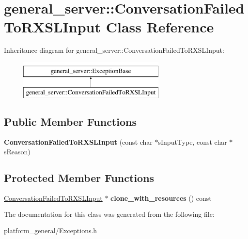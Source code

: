 \hypertarget{classgeneral__server_1_1ConversationFailedToRXSLInput}{\section{general\-\_\-server\-:\-:\-Conversation\-Failed\-To\-R\-X\-S\-L\-Input \-Class \-Reference}
\label{classgeneral__server_1_1ConversationFailedToRXSLInput}
}
\-Inheritance diagram for general\-\_\-server\-:\-:\-Conversation\-Failed\-To\-R\-X\-S\-L\-Input\-:\begin{figure}[H]
\begin{center}
\leavevmode
\includegraphics[height=2.000000cm]{classgeneral__server_1_1ConversationFailedToRXSLInput}
\end{center}
\end{figure}
\subsection*{\-Public \-Member \-Functions}
\begin{DoxyCompactItemize}
\item 
\hypertarget{classgeneral__server_1_1ConversationFailedToRXSLInput_ab721aea7842bee06af78520ae6aac216}{{\bfseries \-Conversation\-Failed\-To\-R\-X\-S\-L\-Input} (const char $\ast$s\-Input\-Type, const char $\ast$s\-Reason)}\label{classgeneral__server_1_1ConversationFailedToRXSLInput_ab721aea7842bee06af78520ae6aac216}

\end{DoxyCompactItemize}
\subsection*{\-Protected \-Member \-Functions}
\begin{DoxyCompactItemize}
\item 
\hypertarget{classgeneral__server_1_1ConversationFailedToRXSLInput_ae1f0ab44c13502db1df4b26135f75f7d}{\hyperlink{classgeneral__server_1_1ConversationFailedToRXSLInput}{\-Conversation\-Failed\-To\-R\-X\-S\-L\-Input} $\ast$ {\bfseries clone\-\_\-with\-\_\-resources} () const }\label{classgeneral__server_1_1ConversationFailedToRXSLInput_ae1f0ab44c13502db1df4b26135f75f7d}

\end{DoxyCompactItemize}


\-The documentation for this class was generated from the following file\-:\begin{DoxyCompactItemize}
\item 
platform\-\_\-general/\-Exceptions.\-h\end{DoxyCompactItemize}
